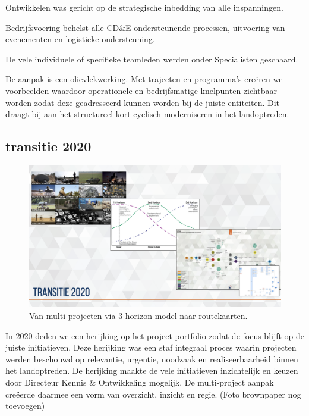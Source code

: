 \documentclass[
]{book}
\begin{document}
Ontwikkelen was gericht op de strategische inbedding van alle inspanningen.

Bedrijfsvoering behelst alle CD\&E ondersteunende processen, uitvoering van evenementen en logistieke ondersteuning.

De vele individuele of specifieke teamleden werden onder Specialisten geschaard.

De aanpak is een olievlekwerking. Met trajecten en programma's creëren we voorbeelden waardoor operationele en bedrijfsmatige knelpunten zichtbaar worden zodat deze geadresseerd kunnen worden bij de juiste entiteiten. Dit draagt bij aan het structureel kort-cyclisch moderniseren in het landoptreden.

\hypertarget{transitie-2020}{%
\subsection{transitie 2020}\label{transitie-2020}}

\begin{figure}
\includegraphics[width=26.67in]{data/keynote-slides/20200430-CDE-Designprocess/20200430-CDE-Designprocess.009-3} \caption{Van multi projecten via 3-horizon model naar routekaarten.}\label{fig:unnamed-chunk-8}
\end{figure}

In 2020 deden we een herijking op het project portfolio zodat de focus blijft op de juiste initiatieven. Deze herijking was een staf integraal proces waarin projecten werden beschouwd op relevantie, urgentie, noodzaak en realiseerbaarheid binnen het landoptreden. De herijking maakte de vele initiatieven inzichtelijk en keuzen door Directeur Kennis \& Ontwikkeling mogelijk. De multi-project aanpak creëerde daarmee een vorm van overzicht, inzicht en regie. (Foto brownpaper nog toevoegen)
\end{document}
